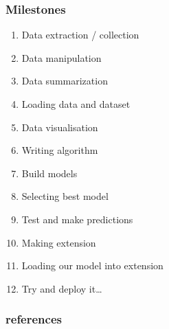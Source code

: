 \documentclass[14pt]{beamer}
\begin{document}
\begin{frame}
    \frametitle{Milestones}
    \begin{enumerate}
        \item{Data extraction / collection}
        \item{Data manipulation}
        \item{Data summarization}
        \item{Loading data and dataset}
        \item{Data visualisation}
        \item{Writing algorithm}
        \item{Build models}
        \item{Selecting best model}
        \item{Test and make predictions}
        \item{Making extension}
        \item{Loading our model into extension}
        \item{Try and deploy it…}
    \end{enumerate}
\end{frame}

\begin{frame}
    \frametitle{references}
    \href{https://github.com/arvind-rs/phishing_detector}{}
    \href{https://github.com/faizann24/phishytics-machine-learning-for-phishing}{}
    \href{https://machinelearningmastery.com/machine-learning-in-python-step-by-step/}{}
\end{frame}
\end{document}
